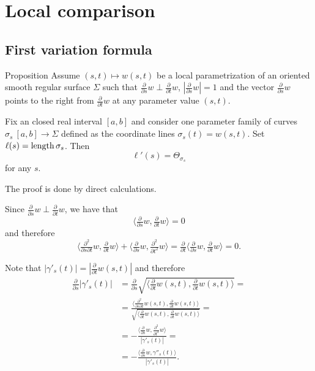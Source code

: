 \chapter{Local comparison}

\section{First variation formula}

\begin{thm}{Proposition}\label{prop:first-var}
Assume $(s,t)\mapsto w(s,t)$ be a local parametrization of an oriented smooth regular surface $\Sigma$ such that 
$\tfrac{\partial}{\partial s}w\perp \tfrac{\partial}{\partial t}w$, $|\tfrac{\partial}{\partial s}w|=1$ and the vector $\tfrac{\partial}{\partial s}w$ points to the right from $\tfrac{\partial}{\partial t}w$ at any parameter value $(s,t)$.

Fix an closed real interval $[a,b]$ and consider one parameter family of curves $\sigma_s\:[a,b]\to \Sigma$  defined as the coordinate lines $\sigma_s(t)=w(s,t)$.
Set $\ell(s)=\mathop{\rm length}\nolimits \sigma_s$.
Then
\[\ell'(s)=\Theta_{\sigma_s}\]
for any $s$.
\end{thm}

The proof is done by direct calculations.

Since $\tfrac{\partial}{\partial s}w\perp \tfrac{\partial}{\partial t}w$, we have that
\[\langle\tfrac{\partial}{\partial s}w, \tfrac{\partial}{\partial t}w\rangle=0\]
and therefore
\[\langle\tfrac{\partial^2}{\partial s\partial t}w, \tfrac{\partial}{\partial t}w\rangle
+\langle\tfrac{\partial}{\partial s}w, \tfrac{\partial^2}{\partial t^2}w\rangle=\tfrac{\partial}{\partial t}\langle\tfrac{\partial}{\partial s}w, \tfrac{\partial}{\partial t}w\rangle=0.\]

Note that $|\gamma'_s(t)|=|\tfrac{\partial}{\partial t}w(s,t)|$ and therefore
\begin{align*}
\tfrac \partial {\partial s}|\gamma'_s(t)|&=\tfrac \partial {\partial s}\sqrt{\langle \tfrac{\partial}{\partial t}w(s,t),\tfrac{\partial}{\partial t}w(s,t)\rangle}=
\\
&=\frac{\langle \tfrac{\partial^2}{\partial s\partial t}w(s,t),\tfrac{\partial}{\partial t}w(s,t)\rangle}{\sqrt{\langle \tfrac{\partial}{\partial t}w(s,t),\tfrac{\partial}{\partial t}w(s,t)\rangle}}=
\\
&=-\frac{\langle\tfrac{\partial}{\partial s}w, \tfrac{\partial^2}{\partial t^2}w\rangle}{|\gamma'_s(t)|}=
\\
&=-\frac{\langle\tfrac{\partial}{\partial s}w, \gamma''_s(t)\rangle}{|\gamma'_s(t)|}.
\end{align*}

